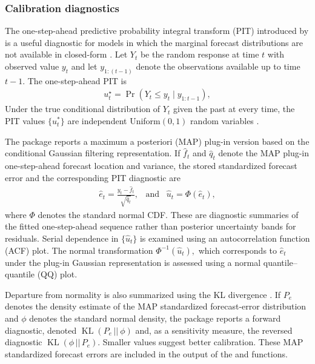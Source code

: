 \documentclass{jss}
\newcommand{\KL}{\operatorname{KL}}
\begin{document}
\subsubsection{Calibration diagnostics}
The one-step-ahead predictive probability integral transform (PIT) introduced by \cite{rosenblatt1952remarks} is a useful diagnostic for models in which the marginal forecast distributions are not available in closed-form \citep{huerta2003time,prado2006multivariate}. Let $Y_t$ be the random response at time $t$ with observed value $y_t$ and let $y_{1:(t-1)}$ denote the observations available up to time $t-1.$ The one-step-ahead PIT is
\begin{align}
u_t^\star = \Pr(Y_t \leq y_t \mid y_{1:t-1}),
\label{eq:pit_ideal}
\end{align}
 Under the true conditional distribution of $Y_t$
  given the past at every time, the PIT values $\{u_t^*\}$ are independent Uniform$(0,1)$ random variables \citep{rosenblatt1952remarks}.

  The package reports a maximum a posteriori (MAP) plug-in version based on the conditional Gaussian filtering representation. If \(\hat f_t\) and \(\hat q_t\) denote the MAP plug-in one-step-ahead forecast location and variance, the stored standardized forecast error and the corresponding PIT diagnostic are
\begin{align}
\hat e_t =
\frac{y_t-\hat f_t}{\sqrt{\hat q_t}}, \;\;\; \text{and}
\label{eq:standardized_error}
\;\;\;
\hat{u}_t = \Phi(\hat e_t),
\end{align}
where $\Phi$ denotes the standard normal CDF. These are diagnostic summaries of the fitted one-step-ahead sequence rather than posterior uncertainty bands for residuals.
Serial dependence in $\{\hat u_t\}$ is examined using an autocorrelation function (ACF) plot. The normal transformation $\Phi^{-1}(\hat{u}_t),$ which corresponds to $\hat{e}_t$ under the plug-in Gaussian representation is assessed using a normal quantile--quantile (QQ) plot.

Departure from normality is also summarized using the KL divergence \citep{kullback1951information}.
If $P_e$ denotes the density estimate of the MAP standardized forecast-error distribution and $\phi$ denotes the standard normal density, the package reports a forward diagnostic, denoted $\KL(P_e\,|| \ \phi)$ and, as a sensitivity measure, the reversed diagnostic $\KL(\phi \,||\,P_e)$.
Smaller values suggest better calibration.
These MAP standardized forecast errors are included in the output of the  and  functions.
\end{document}
